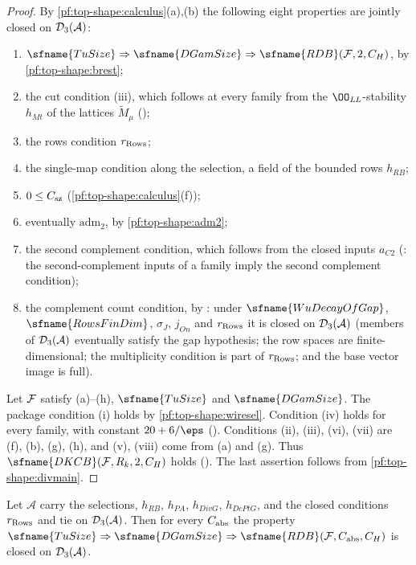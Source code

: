 \begin{proof}
By \cref{pf:top-shape:calculus}(a),(b) the following eight properties are jointly closed on $\mathcal{D}_3(\mathcal A)$:
\begin{enumerate}[label=(\alph*)]
\item $\sfname{TuSize}\Rightarrow\sfname{DGamSize}\Rightarrow\sfname{RDB}(\topshapeF,2,C_H)$, by
\cref{pf:top-shape:brest};
\item the cut condition (iii), which follows at every family from the $\OO_{\mathit{LL}}$-stability $h_{Mt}$ of the
lattices $\widetilde M_\mu$ ();
\item the rows condition $r_{\rm Rows}$;
\item the single-map condition along the selection, a field of the bounded rows $h_{RB}$;
\item $0\le C_{\rm sz}$ (\cref{pf:top-shape:calculus}(f));
\item eventually $\mathrm{adm}_2$, by \cref{pf:top-shape:adm2};
\item the second complement condition, which follows from the closed inputs $a_{C2}$
(: the second-complement inputs of a family imply the
second complement condition);
\item the complement count condition, by : under
$\sfname{WuDecayOfGap}$, $\sfname{RowsFinDim}$, $\sigma_J$, $j_{On}$ and $r_{\rm Rows}$ it is closed on
$\mathcal{D}_3(\mathcal A)$ (members of $\mathcal{D}_3(\mathcal A)$ eventually satisfy the gap hypothesis; the row spaces are
finite-dimensional; the multiplicity condition is part of $r_{\rm Rows}$; and the base vector image is full).
\end{enumerate}
Let $\mathcal{F}$ satisfy (a)--(h), $\sfname{TuSize}$ and $\sfname{DGamSize}$. The package condition (i) holds by
\cref{pf:top-shape:wiresel}. Condition (iv) holds for every family, with constant $20+6/\eps$
(). Conditions (ii), (iii), (vi), (vii) are
(f), (b), (g), (h), and (v), (viii) come from (a) and (g). Thus $\sfname{DKCB}(\topshapeF,R_k,2,C_H)$ holds
(). The last assertion follows from
\cref{pf:top-shape:divmain}.
\end{proof}

\begin{proposition}\label{pf:top-shape:brest}
Let $\mathcal A$ carry the selections, $h_{RB}$, $h_{PA}$, $h_{DivG}$, $h_{DcPtG}$, and the closed conditions
$r_{\rm Rows}$ and $\mathrm{tie}$ on $\mathcal{D}_3(\mathcal A)$. Then for every $C_{\rm abs}$ the property
$\sfname{TuSize}\Rightarrow\sfname{DGamSize}\Rightarrow\sfname{RDB}(\topshapeF,C_{\rm abs},C_H)$ is closed on
$\mathcal{D}_3(\mathcal A)$.
\end{proposition}

